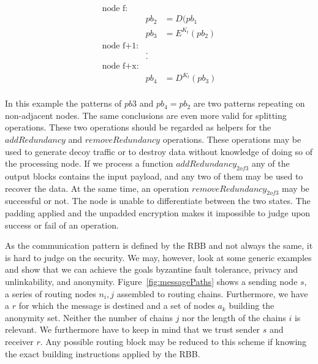 \documentclass[acmsmall, screen, review]{acmart}
\begin{document}
	\begin{eqnarray*}
		\text{node f:}\\
		& pb_2 & = D(pb_1\\
		& pb_3 & = E^{K_t}(pb_2)\\
		\text{node f+1:}\\
		&.\\
		&.\\    
		\text{node f+x:}\\
		& pb_4 & = D^{K_t}(pb_3)\\
	\end{eqnarray*}
	
	In this example the patterns of $pb3$ and $pb_4=pb_2$ are two patterns repeating on non-adjacent nodes. The same conclusions are even more valid for splitting operations. These two operations should be regarded as helpers for the $addRedundancy$ and $removeRedundancy$ operations. These operations may be used to generate decoy traffic or to destroy data without knowledge of doing so of the processing node. If we process a function $addRedundancy_{2 of 3}$ any of the output blocks contains the input payload, and any two of them may be used to recover the data. At the same time, an operation $removeRedundancy_{2 of 3}$ may be successful or not. The node is unable to differentiate between the two states. The padding applied and the unpadded encryption makes it impossible to judge upon success or fail of an operation.
	
	As the communication pattern is defined by the RBB and not always the same, it is hard to judge on the security. We may, however, look at some generic examples and show that we can achieve the goals byzantine fault tolerance, privacy and unlinkability, and anonymity. Figure~\ref{fig:messagePaths} shows a sending node $s$, a series of routing nodes $n_i,j$ assembled to routing chains. Furthermore, we have a $r$ for which the message is destined and a set of nodes $a_k$ building the anonymity set. Neither the number of chains $j$ nor the length of the chains $i$ is relevant. We furthermore have to keep in mind that we trust sender $s$ and receiver $r$. Any possible routing block may be reduced to this scheme if knowing the exact building instructions applied by the RBB.
	
\end{document}
